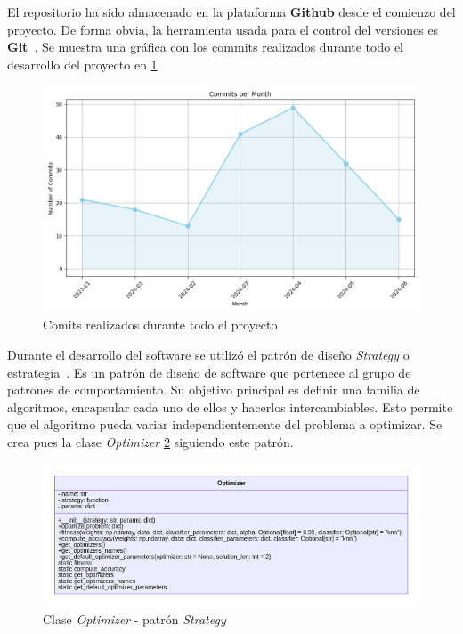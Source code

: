 El repositorio ha sido almacenado en la plataforma \textbf{Github} desde el comienzo del proyecto. De forma obvia, la herramienta usada para el control del versiones es \textbf{Git}~\cite{chacon2014pro}. Se muestra una gráfica con los commits realizados durante todo el desarrollo del proyecto en \ref{fig:commits}

\begin{figure}[htp]
    \centering
    \includegraphics[width=1\textwidth]{imagenes/commits_chart.png}
    \caption{Comits realizados durante todo el proyecto}
    \label{fig:commits}
\end{figure}

Durante el desarrollo del software se utilizó el patrón de diseño \textit{Strategy} o estrategia~\cite{refactoring-guru-strategy}. Es un patrón de diseño de software que pertenece al grupo de patrones de comportamiento. Su objetivo principal es definir una familia de algoritmos, encapsular cada uno de ellos y hacerlos intercambiables. Esto permite que el algoritmo pueda variar independientemente del problema a optimizar. Se crea pues la clase \textit{Optimizer} \ref{fig:optimizer_class} siguiendo este patrón.

\begin{figure}[htp]
    \centering
    \includegraphics[width=1.2\textwidth]{imagenes/mermaid-diagram-20240616183528.png}
    \caption{Clase \textit{Optimizer} - patrón \textit{Strategy}}
    \label{fig:optimizer_class}
\end{figure}


